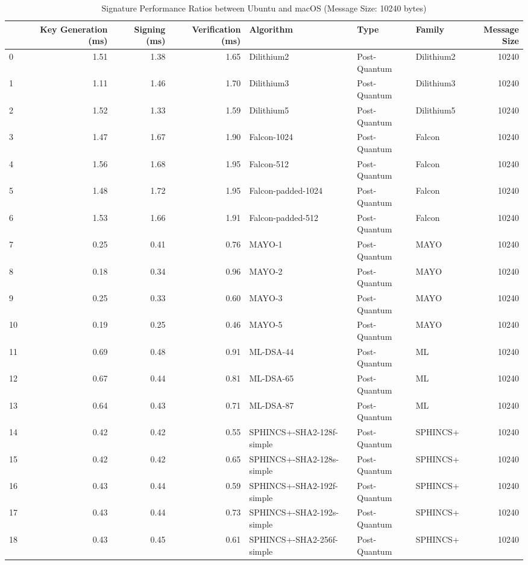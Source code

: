 \begin{table}
\caption{Signature Performance Ratios between Ubuntu and macOS (Message Size: 10240 bytes)}
\label{tab:desktop_sig_ratio_10240}
\begin{tabular}{lrrrlllr}
\toprule
 & Key Generation (ms) & Signing (ms) & Verification (ms) & Algorithm & Type & Family & Message Size \\
\midrule
0 & 1.51 & 1.38 & 1.65 & Dilithium2 & Post-Quantum & Dilithium2 & 10240 \\
1 & 1.11 & 1.46 & 1.70 & Dilithium3 & Post-Quantum & Dilithium3 & 10240 \\
2 & 1.52 & 1.33 & 1.59 & Dilithium5 & Post-Quantum & Dilithium5 & 10240 \\
3 & 1.47 & 1.67 & 1.90 & Falcon-1024 & Post-Quantum & Falcon & 10240 \\
4 & 1.56 & 1.68 & 1.95 & Falcon-512 & Post-Quantum & Falcon & 10240 \\
5 & 1.48 & 1.72 & 1.95 & Falcon-padded-1024 & Post-Quantum & Falcon & 10240 \\
6 & 1.53 & 1.66 & 1.91 & Falcon-padded-512 & Post-Quantum & Falcon & 10240 \\
7 & 0.25 & 0.41 & 0.76 & MAYO-1 & Post-Quantum & MAYO & 10240 \\
8 & 0.18 & 0.34 & 0.96 & MAYO-2 & Post-Quantum & MAYO & 10240 \\
9 & 0.25 & 0.33 & 0.60 & MAYO-3 & Post-Quantum & MAYO & 10240 \\
10 & 0.19 & 0.25 & 0.46 & MAYO-5 & Post-Quantum & MAYO & 10240 \\
11 & 0.69 & 0.48 & 0.91 & ML-DSA-44 & Post-Quantum & ML & 10240 \\
12 & 0.67 & 0.44 & 0.81 & ML-DSA-65 & Post-Quantum & ML & 10240 \\
13 & 0.64 & 0.43 & 0.71 & ML-DSA-87 & Post-Quantum & ML & 10240 \\
14 & 0.42 & 0.42 & 0.55 & SPHINCS+-SHA2-128f-simple & Post-Quantum & SPHINCS+ & 10240 \\
15 & 0.42 & 0.42 & 0.65 & SPHINCS+-SHA2-128s-simple & Post-Quantum & SPHINCS+ & 10240 \\
16 & 0.43 & 0.44 & 0.59 & SPHINCS+-SHA2-192f-simple & Post-Quantum & SPHINCS+ & 10240 \\
17 & 0.43 & 0.44 & 0.73 & SPHINCS+-SHA2-192s-simple & Post-Quantum & SPHINCS+ & 10240 \\
18 & 0.43 & 0.45 & 0.61 & SPHINCS+-SHA2-256f-simple & Post-Quantum & SPHINCS+ & 10240 \\

\end{tabular}
\end{table}
